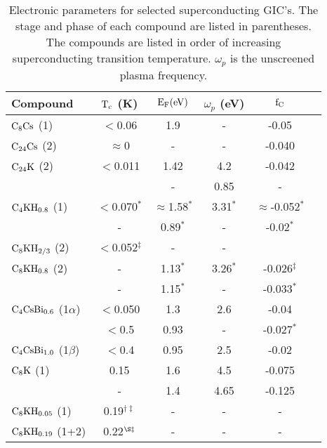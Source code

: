 \begin{table}
\caption[Electronic parameters of the superconducting GIC's.]{Electronic 
parameters for selected superconducting GIC's.  The stage and phase of each
compound are listed in parentheses.
  The
compounds are listed in order of increasing superconducting transition
temperature. $\omega_p$ is the unscreened plasma frequency.}
\label{electronicparams}
\begin{center}
\begin{tabular}{|lc|cccc|}
\hline
Compound & $\rm T_c$ (K) & $\rm E_F (eV)$ &  $\omega_p$ (eV) & $\rm f_C$ \\
\hline
$\rm C_8Cs$ (1) & $<$0.06\cite{tanuma81} & 1.9\cite{lagues84}&-& -0.05\cite{takahashi86,dicenzo86}\\
$\rm C_{24}Cs$ (2) & $\approx$0 &-&-& -0.040\cite{fretigny85}\\
$\rm C_{24}K$ (2) & $<$0.011\cite{koike80} & 1.42\cite{doll87} & 4.2\cite{doll87} & -0.042\cite{doll87,I63,preil84}\\
& &-& 0.85\cite{preil84,preil83} &-& \\
$\rm C_4KH_{0.8}$  (1) & $<$0.070$^{\ast}$\cite{suzuki85b} &
$\approx$1.58$^{\ast}$\cite{doll87} & 3.31$^{\ast}$\cite{doll87} & $\approx$-0.052$^{\ast}$\cite{doll87}\\
&-& 0.89$^{\ast}$\cite{O353} & - & -0.02$^{\ast}$\cite{Z260}\\
$\rm C_8KH_{2/3}$ (2) & $<$0.052$^{\ddag}$\cite{sano80} & - & -  \\
$\rm C_8KH_{0.8}$ (2) & - & 1.13$^{\ast}$\cite{doll87} & 3.26$^{\ast}$\cite{doll87} & -0.026$^{\ddag}$\cite{doll87} \\
&-& 1.15$^{\ast}$\cite{Z260} &-& -0.033$^{\ast}$\cite{Z260}\\
$\rm C_4CsBi_{0.6}$ (1$\alpha$) & $<$0.050\cite{stang88} & 1.3\cite{yang88} & 2.6\cite{yang88} & -0.04\cite{yang88}\\
& $<$0.5\cite{E291} & 0.93\cite{E291} &-& -0.027$^*$\\
$\rm C_4CsBi_{1.0}$ (1$\beta$) & $<$0.4\cite{E291} & 0.95\cite{yang88} & 2.5\cite{yang88} & -0.02\cite{yang88}\\
$\rm C_8K$ (1) & 0.15\cite{kaneiwa82} & 1.6\cite{doll87} & 4.5\cite{doll87} & -0.075\cite{tanuma78}\\
&-& 1.4\cite{tanuma78} & 4.65\cite{fischer85} & -0.125\cite{preil84}\\
$\rm C_8KH_{0.05}$ (1) & 0.19$^{\dagger\ddag}$\cite{enoki85} & - & - & -\\
$\rm C_8KH_{0.19}$ (1+2) & 0.22$^{\S\ddag}$\cite{kaneiwa82} & - & - & -\\

\end{tabular}
\end{center}
\end{table}
